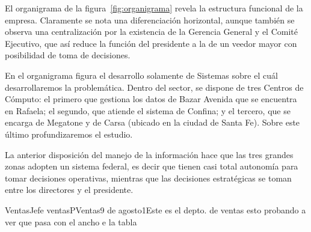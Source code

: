 El organigrama de la figura~\ref{fig:organigrama} revela la estructura
funcional de la empresa.  Claramente se nota una diferenciación horizontal,
aunque también se observa una centralización  por la existencia de la Gerencia
General y el Comité Ejecutivo, que así reduce la función del presidente a la de
un veedor mayor con posibilidad de toma de decisiones.

En el organigrama figura el desarrollo solamente de Sistemas sobre el cuál
desarrollaremos la problemática. Dentro del sector, se dispone de tres Centros
de Cómputo: el primero que gestiona los datos de Bazar Avenida que se encuentra
en Rafaela; el segundo, que atiende el sistema de Confina; y el tercero, que se
encarga de Megatone y de Carsa (ubicado en la ciudad de Santa Fe). Sobre este
último profundizaremos el estudio.

La anterior disposición del manejo de la información hace que las tres grandes
zonas adopten un sistema federal, es decir que tienen casi total autonomía para
tomar decisiones operativas, mientras que las decisiones estratégicas se toman
entre los directores y el presidente.



\begin{apx}{Ventas}{Jefe ventas}{PVentas}{9 de agosto}{1}{Este es el depto. de ventas esto probando a ver que pasa con el ancho e la tabla}
\end{apx}
